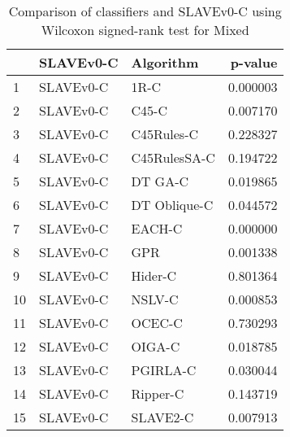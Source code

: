 \begin{table}
\footnotesize
\caption{Comparison of classifiers and SLAVEv0-C using Wilcoxon signed-rank test for Mixed}
\label{tab:SLAVEv0-C wilcoxon Mixed comparison}
\begin{tabular}{lllr}
\hline
 & SLAVEv0-C & Algorithm & p-value \\
\hline
1 & SLAVEv0-C & 1R-C & 0.000003 \\
2 & SLAVEv0-C & C45-C & 0.007170 \\
3 & SLAVEv0-C & C45Rules-C & 0.228327 \\
4 & SLAVEv0-C & C45RulesSA-C & 0.194722 \\
5 & SLAVEv0-C & DT GA-C & 0.019865 \\
6 & SLAVEv0-C & DT Oblique-C & 0.044572 \\
7 & SLAVEv0-C & EACH-C & 0.000000 \\
8 & SLAVEv0-C & GPR & 0.001338 \\
9 & SLAVEv0-C & Hider-C & 0.801364 \\
10 & SLAVEv0-C & NSLV-C & 0.000853 \\
11 & SLAVEv0-C & OCEC-C & 0.730293 \\
12 & SLAVEv0-C & OIGA-C & 0.018785 \\
13 & SLAVEv0-C & PGIRLA-C & 0.030044 \\
14 & SLAVEv0-C & Ripper-C & 0.143719 \\
15 & SLAVEv0-C & SLAVE2-C & 0.007913 \\
\hline
\end{tabular}
\end{table}
